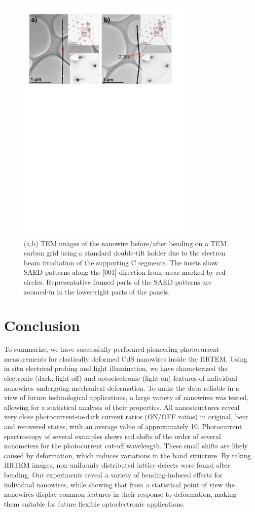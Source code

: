 \begin{figure}  
\centering
\includegraphics[width=250pt]{figures/figure6_5}
\caption[Diffraction of NW under strain]
{(a,b) TEM images of the nanowire before/after bending on a TEM carbon grid using a standard double-tilt holder due to the electron beam irradiation of the supporting C segments. The insets show SAED patterns along the [001] direction from areas marked by red circles. Representative framed parts of the SAED patterns are zoomed-in in the lower-right parts of the panels.
\label{fig:6_5}}
\end{figure}

\section{Conclusion}
To summarize, we have successfully performed pioneering photocurrent measurements for elastically deformed CdS nanowires inside the HRTEM. Using in situ electrical probing and light illumination, we have characterized the electronic (dark, light-off) and optoelectronic (light-on) features of individual nanowires undergoing mechanical deformation. To make the data reliable in a view of future technological applications, a large variety of nanowires was tested, allowing for a statistical analysis of their properties. All nanostructures reveal very close photocurrent-to-dark current ratios (ON/OFF ratios) in original, bent and recovered states, with an average value of approximately 10. Photocurrent spectroscopy of several examples shows red shifts of the order of several nanometers for the photocurrent cut-off wavelength. These small shifts are likely caused by deformation, which induces variations in the band structure. By taking HRTEM images, non-uniformly distributed lattice defects were found after bending. Our experiments reveal a variety of bending-induced effects for individual nanowires, while showing that from a statistical point of view the nanowires display common features in their response to deformation, making them suitable for future flexible optoelectronic applications. 

